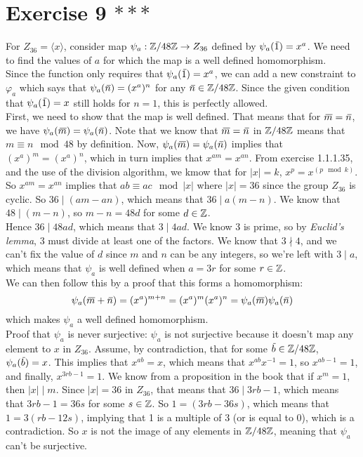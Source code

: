 \documentclass[12pt]{article}
\begin{document}
    \section*{Exercise 9 $***$}
    For $Z_{36} = \langle x \rangle$,
    consider map $\psi_a: \mathbb{Z}/48\mathbb{Z} \to Z_{36}$
    defined by $\psi_a(\,\overline{\!{1}}) = x^a$.
    We need to find the values of $a$ for which the map is a well
    defined homomorphism. \\
    Since the function only requires that $\psi_a(\,\overline{\!{1}}) = x^a$,
    we can add a new constraint to $\varphi_a$ which says that 
    $\psi_a(\,\overline{\!{n}}) = (x^a)^n$ for any $\,\overline{\!{n}} \in \mathbb{Z}/48\mathbb{Z}$.
    Since the given condition that $\psi_a(\,\overline{\!{1}}) = x$
    still holds for $n = 1$, this is perfectly allowed. \\
    First, we need to show that the map is well defined.
    That means that for $\,\overline{\!{m}} = \,\overline{\!{n}}$,
    we have $\psi_a(\,\overline{\!{m}}) = \psi_a(\,\overline{\!{n}})$.
    Note that we know that $\,\overline{\!{m}} = \,\overline{\!{n}}$ in $\mathbb{Z}/48\mathbb{Z}$
    means that $m \equiv n \mod 48$ by definition.
    Now, $\psi_a(\,\overline{\!{m}}) = \psi_a(\,\overline{\!{n}})$
    implies that $(x^a)^m = (x^a)^n$,
    which in turn implies that $x^{am} = x^{an}$.
    From exercise 1.1.1.35, and the use of the division
    algorithm, we kmow that for $|x| = k$, $x^p = x^{(p \mod k)}$.
    So $x^{am} = x^{an}$ implies that $ab \equiv ac \mod |x|$
    where $|x| = 36$ since the group $Z_{36}$ is cyclic.
    So $36 \mid (am - an)$,
    which means that $36 \mid a(m - n)$.
    We know that $48 \mid (m - n)$,
    so $m - n = 48d$ for some $d \in \mathbb{Z}$. \\
    Hence $36 \mid 48ad$,
    which means that $3 \mid 4ad$.
    We know 3 is prime, so by \textit{Euclid's lemma},
    3 must divide at least one of the factors.
    We know that $3 \nmid 4$,
    and we can't fix the value of $d$ since $m$ and $n$
    can be any integers,
    so we're left with $3 \mid a$,
    which means that $\psi_a$ is well defined when
    $a = 3r$ for some $r \in \mathbb{Z}$. \\
    We can then follow this by a proof that this forms a homomorphism:
    \[ \psi_a(\,\overline{\!{m}} + \,\overline{\!{n}}) = (x^a)^{m + n}
    = (x^a)^m(x^a)^n
    = \psi_a(\,\overline{\!{m}})\psi_a(\,\overline{\!{n}})  \]
    which makes $\psi_a$ a well defined homomorphism. \\
    Proof that $\psi_a$ is never surjective:
    $\psi_a$ is not surjective because it doesn't map any element
    to $x$ in $Z_{36}$.
    Assume, by contradiction, that for some $\,\overline{\!{b}} \in \mathbb{Z}/48\mathbb{Z}$,
    $\psi_a(\,\overline{\!{b}}) = x$.
    This implies that $x^{ab} = x$,
    which means that $x^{ab}x^{-1} = 1$,
    so $x^{ab - 1} = 1$,
    and finally, $x^{3rb - 1} = 1$.
    We know from a proposition in the book that
    if $x^m = 1$, then $|x| \mid m$.
    Since $|x| = 36$ in $Z_{36}$,
    that means that $36 \mid 3rb - 1$,
    which means that $3rb - 1 = 36s$ for some $s \in \mathbb{Z}$.
    So $1 = (3rb - 36s)$,
    which means that $1 = 3(rb - 12s)$,
    implying that 1 is a multiple of 3 (or is equal to 0),
    which is a contradiction.
    So $x$ is not the image of any elements in $\mathbb{Z}/48\mathbb{Z}$,
    meaning that $\psi_a$ can't be surjective.
\end{document}

